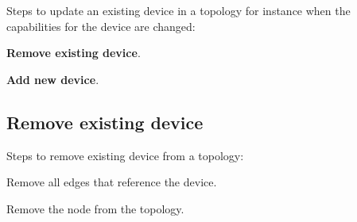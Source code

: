 Steps to update an existing device in a topology for instance when the capabilities for the device are changed:
\begin{compactenum}
\item \textbf{Remove existing device}.
\item \textbf{Add new device}.
\end{compactenum} 
     
\subsection*{Remove existing device}     

Steps to remove existing device from a topology:
\begin{compactenum}
\item Remove all edges that reference the device.
\item Remove the node from the topology.
\end{compactenum}   
